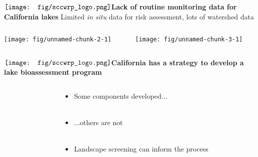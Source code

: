 \documentclass[serif]{beamer}\usepackage[]{graphicx}\usepackage[]{color}
\makeatletter
\def\maxwidth{ %
  \ifdim\Gin@nat@width>\linewidth
    \linewidth
  \else
    \Gin@nat@width
  \fi
}
\makeatother
\begin{document}
\begin{frame}[t]{{$\vcenter{\hbox{\texttt{[image: fig/sccwrp\_logo.png]}}}$\hspace{0.07in}\textbf{Lack of routine monitoring data for California lakes}}}
Limited \textit{in situ} data for risk assessment, lots of watershed data
\vspace{-0.15in}
\begin{columns}[t]
\begin{column}{0.5\textwidth}


{\centering \texttt{[image: fig/unnamed-chunk-2-1]} 

}



\end{column}
\begin{column}{0.5\textwidth}


{\centering \texttt{[image: fig/unnamed-chunk-3-1]} 

}



\end{column}
\end{columns}
\vspace{-0.25in}
{\tiny
\cite{USEPA09,USEPA17,Hill18}
}
\end{frame}

\begin{frame}{{$\vcenter{\hbox{\texttt{[image: fig/sccwrp\_logo.png]}}}$\hspace{0.07in}\textbf{California has a strategy to develop a lake bioassessment program}}}
\begin{columns}
\begin{column}{0.5\textwidth}
\begin{overlayarea}{\textwidth}{0.6\textheight}
\centering
{}
\end{overlayarea}
\end{column}
\begin{column}{0.5\textwidth}
\begin{itemize}
\item<2->Some components developed... \\~\\
\item<3->...others are not \\~\\
\item<4->Landscape screening can inform the process
\end{itemize}
\end{column}
\end{columns}
\end{frame}
\end{document}
